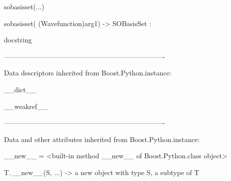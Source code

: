 \documentclass[letterpaper,10pt,english]{sphinxmanual}
\begin{document}
\begin{description}
\begin{description}
\begin{DUlineblock}{0em}
\item[] sobasisset(...)
\item[]
\begin{DUlineblock}{\DUlineblockindent}
\item[] sobasisset( (Wavefunction)arg1) -\textgreater{} SOBasisSet :
\item[]
\begin{DUlineblock}{\DUlineblockindent}
\item[] docstring
\item[] 
\end{DUlineblock}
\end{DUlineblock}
\item[] ----------------------------------------------------------------------
\item[] Data descriptors inherited from Boost.Python.instance:
\item[] 
\item[] \_\_dict\_\_
\item[] 
\item[] \_\_weakref\_\_
\item[] 
\item[] ----------------------------------------------------------------------
\item[] Data and other attributes inherited from Boost.Python.instance:
\item[] 
\item[] \_\_new\_\_ = \textless{}built-in method \_\_new\_\_ of Boost.Python.class object\textgreater{}
\item[]
\begin{DUlineblock}{\DUlineblockindent}
\item[] T.\_\_new\_\_(S, ...) -\textgreater{} a new object with type S, a subtype of T
\end{DUlineblock}
\end{DUlineblock}


\end{description}
\end{description}
\end{document}

